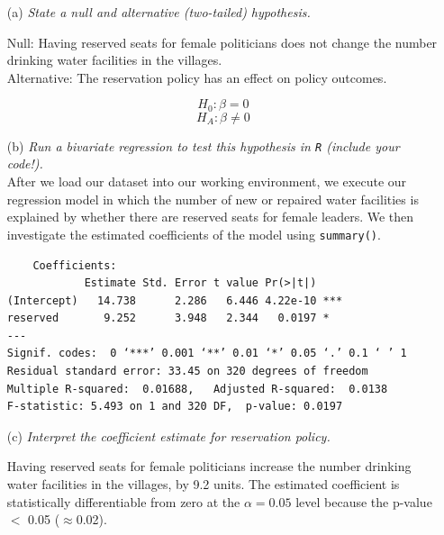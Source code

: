 \documentclass[12pt,letterpaper]{article}
\begin{document}
\begin{enumerate}
	\item [(a)] \textit{State a null and alternative (two-tailed) hypothesis. }
	
	Null: Having reserved seats for female politicians does not change the number drinking water facilities in the villages.\\
	
	Alternative: The reservation policy has an effect on policy outcomes.
	
	$$H_0: \beta = 0$$
	$$H_A: \beta \neq 0$$
	
	\item [(b)] \textit{Run a bivariate regression to test this hypothesis in \texttt{R} (include your code!).}\\
	
					\vspace{.15cm}
	After we load our dataset into our working environment, we execute our regression model in which the number of new or repaired water facilities is explained by whether there are reserved seats for female leaders. We then investigate the estimated coefficients of the model using \texttt{summary()}.\\
	
					\vspace{.15cm}
	  
	\begin{footnotesize}
		
		\begin{verbatim}
	Coefficients:
            Estimate Std. Error t value Pr(>|t|)    
(Intercept)   14.738      2.286   6.446 4.22e-10 ***
reserved       9.252      3.948   2.344   0.0197 *  
---
Signif. codes:  0 ‘***’ 0.001 ‘**’ 0.01 ‘*’ 0.05 ‘.’ 0.1 ‘ ’ 1
Residual standard error: 33.45 on 320 degrees of freedom
Multiple R-squared:  0.01688,	Adjusted R-squared:  0.0138 
F-statistic: 5.493 on 1 and 320 DF,  p-value: 0.0197
		\end{verbatim}
	\end{footnotesize}
	\item [(c)] \textit{Interpret the coefficient estimate for reservation policy.} 
	
				\vspace{.25cm}
	
	Having reserved seats for female politicians increase the number drinking water facilities in the villages, by 9.2 units. The estimated coefficient is statistically differentiable from zero at the $\alpha=0.05$ level because the p-value $<$ 0.05 ($\approx $0.02).
\end{enumerate}
\end{document}
